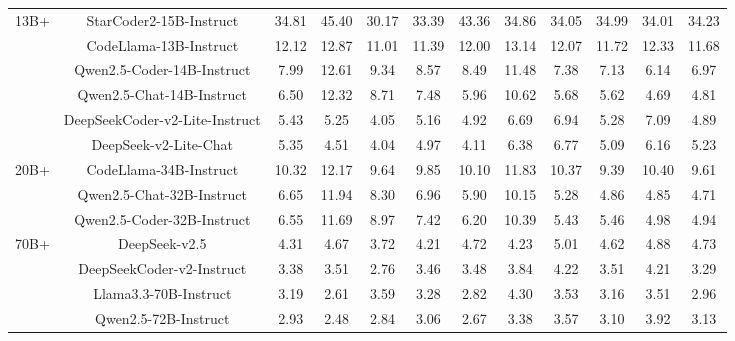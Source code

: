 \documentclass[11pt, a4paper, logo, copyright, nonumbering, amsart]{map}
\begin{document}
\begin{CJK*}{UTF8}{gbsn}
\begin{table*}[h!]
\begin{adjustbox}{width=\textwidth}
\begin{tabular}{c|c|cccccccccc}
    \midrule
    \multirow{6}{*}{13B+} 
    & StarCoder2-15B-Instruct & 34.81 & 45.40 & 30.17 & 33.39 & 43.36 & 34.86 & 34.05 & 34.99 & 34.01 & 34.23 \\
    & CodeLlama-13B-Instruct & 12.12 & 12.87 & 11.01 & 11.39 & 12.00 & 13.14 & 12.07 & 11.72 & 12.33 & 11.68 \\
    & Qwen2.5-Coder-14B-Instruct & 7.99 & 12.61 & 9.34 & 8.57 & 8.49 & 11.48 & 7.38 & 7.13 & 6.14 & 6.97 \\
    & Qwen2.5-Chat-14B-Instruct & 6.50 & 12.32 & 8.71 & 7.48 & 5.96 & 10.62 & 5.68 & 5.62 & 4.69 & 4.81 \\
    & DeepSeekCoder-v2-Lite-Instruct & 5.43 & 5.25 & 4.05 & 5.16 & 4.92 & 6.69 & 6.94 & 5.28 & 7.09 & 4.89 \\
    & DeepSeek-v2-Lite-Chat & 5.35 & 4.51 & 4.04 & 4.97 & 4.11 & 6.38 & 6.77 & 5.09 & 6.16 & 5.23 \\
    
    \midrule
    \multirow{3}{*}{20B+}
    & CodeLlama-34B-Instruct & 10.32 & 12.17 & 9.64 & 9.85 & 10.10 & 11.83 & 10.37 & 9.39 & 10.40 & 9.61 \\
    & Qwen2.5-Chat-32B-Instruct & 6.65 & 11.94 & 8.30 & 6.96 & 5.90 & 10.15 & 5.28 & 4.86 & 4.85 & 4.71 \\
    & Qwen2.5-Coder-32B-Instruct & 6.55 & 11.69 & 8.97 & 7.42 & 6.20 & 10.39 & 5.43 & 5.46 & 4.98 & 4.94 \\
    
    \midrule
    \multirow{5}{*}{70B+} 
    & DeepSeek-v2.5 & 4.31 & 4.67 & 3.72 & 4.21 & 4.72 & 4.23 & 5.01 & 4.62 & 4.88 & 4.73 \\
    & DeepSeekCoder-v2-Instruct & 3.38 & 3.51 & 2.76 & 3.46 & 3.48 & 3.84 & 4.22 & 3.51 & 4.21 & 3.29 \\
    & Llama3.3-70B-Instruct & 3.19 & 2.61 & 3.59 & 3.28 & 2.82 & 4.30 & 3.53 & 3.16 & 3.51 & 2.96 \\
    & Qwen2.5-72B-Instruct & 2.93 & 2.48 & 2.84 & 3.06 & 2.67 & 3.38 & 3.57 & 3.10 & 3.92 & 3.13 \\
    

\end{tabular}
\end{adjustbox}
\end{table*}
\end{CJK*}
\end{document}
